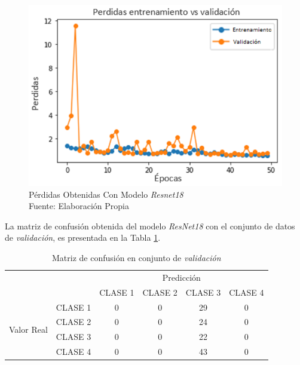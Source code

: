 \newpage
\begin{figure}[ht]
	\centering
	\includegraphics[scale=0.7]{Figs/110.png}
	\caption{Pérdidas Obtenidas Con Modelo \textit{Resnet18}\\ Fuente: Elaboración Propia}
	\label{fig:perdda_RESNET18}
\end{figure}

La matriz de confusión obtenida del modelo \textit{ResNet18} con el conjunto de datos de \textit{validación}, es presentada en la Tabla \ref*{MC_RESNET18}.\\

\begin{table}[htbp]
	\centering
	\resizebox{10cm}{!} {
	\begin{tabular}{|c|l|c|c|c|c|}
		\hline
		\multicolumn{2}{|c|}{\multirow{2}[4]{*}{}} & \multicolumn{4}{c|}{Predicción} \bigstrut\\
		\cline{3-6}    \multicolumn{2}{|c|}{} & CLASE 1 & CLASE 2 & CLASE 3 & CLASE 4 \bigstrut\\
		\hline
		\multirow{4}[8]{*}{\begin{sideways}Valor Real\end{sideways}} & CLASE 1 & 0     & 0     & 29    & 0 \bigstrut\\
		\cline{2-6}          & CLASE 2 & 0     & 0     & 24    & 0 \bigstrut\\
		\cline{2-6}          & CLASE 3 & 0     & 0     & 22    & 0 \bigstrut\\
		\cline{2-6}          & CLASE 4 & 0     & 0     & 43    & 0 \bigstrut\\
		\hline
	\end{tabular}%
	}
	\caption{Matriz de confusión en conjunto de \textit{validación}}
	\label{MC_RESNET18}
\end{table}

